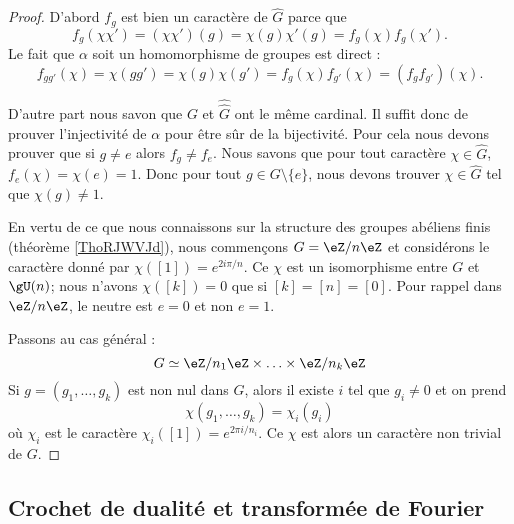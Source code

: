 \begin{proof}

    D'abord \( f_g\) est bien un caractère de \( \hat G\) parce que
    \begin{equation}
        f_g(\chi\chi')=(\chi\chi')(g)=\chi(g)\chi'(g)=f_g(\chi)f_g(\chi').
    \end{equation}
    Le fait que \( \alpha\) soit un homomorphisme de groupes est direct :
    \begin{equation}
        f_{gg'}(\chi)=\chi(gg')=\chi(g)\chi(g')=f_g(\chi)f_{g'}(\chi)=(f_gf_{g'})(\chi).
    \end{equation}

    D'autre part nous savon que \( G\) et \( \hat{\hat G}\) ont le même cardinal. Il suffit donc de prouver l'injectivité de \( \alpha\) pour être sûr de la bijectivité. Pour cela nous devons prouver que si \( g\neq e\) alors \( f_g\neq f_e\). Nous savons que pour tout caractère \( \chi\in \hat G\), \( f_e(\chi)=\chi(e)=1\). Donc pour tout \( g\in G\setminus\{ e \}\), nous devons trouver \( \chi\in \hat G\) tel que \( \chi(g)\neq 1\).

    En vertu de ce que nous connaissons sur la structure des groupes abéliens finis (théorème \ref{ThoRJWVJd}), nous commençons \( G=\eZ/n\eZ\) et considérons le caractère donné par \( \chi([1])= e^{2i\pi/n}\). Ce \( \chi\) est un isomorphisme entre \( G\) et \( \gU(n)\); nous n'avons \( \chi([k])=0\) que si \( [k]=[n]=[0]\). Pour rappel dans \( \eZ/n\eZ\), le neutre est \( e=0\) et non \( e=1\).

    Passons au cas général :
    \begin{equation}
        G\simeq \eZ/n_1\eZ\times \ldots\times \eZ/n_k\eZ
    \end{equation}
    Si \( g=(g_1,\ldots, g_k)\) est non nul dans \( G\), alors il existe \( i\) tel que \( g_i\neq 0\) et on prend
    \begin{equation}
        \chi(g_1,\ldots, g_k)=\chi_i(g_i)
    \end{equation}
    où \( \chi_i\) est le caractère \( \chi_i([1])= e^{2\pi i/n_i}\). Ce \( \chi\) est alors un caractère non trivial de \( G\).
    
\end{proof}

\subsection{Crochet de dualité et transformée de Fourier}

